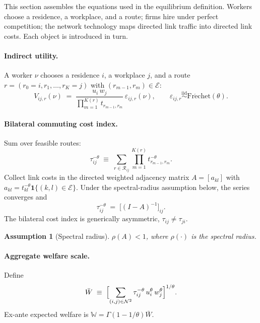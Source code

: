 \documentclass[12pt]{article}
\newtheorem{assumption}{Assumption}
\newcommand{\N}{\mathcal N}
\newcommand{\E}{\mathcal E}
\newcommand{\R}{\mathcal R}
\newcommand{\Wbar}{\bar W}
\newcommand{\tkl}{t_{kl}}
\newcommand{\tijk}{\tau_{ij}}
\begin{document}
This section assembles the equations used in the equilibrium
definition.  Workers choose a residence, a workplace, and a route;
firms hire under perfect competition; the network technology maps
directed link traffic into directed link costs.  Each object is
introduced in turn.

\paragraph{Indirect utility.}
A worker $\nu$ chooses a residence $i$, a workplace $j$, and a route
$r=(r_0=i,r_1,\dots,r_K=j)$ with $(r_{m-1},r_m)\in\E$:
\begin{equation}
  V_{ij,r}(\nu)
  \;=\;
  \frac{u_i\,w_j}{\prod_{m=1}^{K(r)}t_{r_{m-1},r_m}}\,
  \varepsilon_{ij,r}(\nu),
  \qquad
  \varepsilon_{ij,r}\overset{\mathrm{iid}}{\sim}\mathrm{Fr\acute echet}(\theta).
  \label{eq:utility}
\end{equation}

\paragraph{Bilateral commuting cost index.}
Sum over feasible routes:
\begin{equation}
  \tijk^{-\theta}
  \;\equiv\;
  \sum_{r\in\R_{ij}}\prod_{m=1}^{K(r)}t_{r_{m-1},r_m}^{-\theta}.
  \label{eq:tau_def}
\end{equation}
Collect link costs in the directed weighted adjacency matrix
$A=[a_{kl}]$ with $a_{kl}=\tkl^{-\theta}\mathbf 1\{(k,l)\in\E\}$.
Under the spectral-radius assumption below, the series converges and
\begin{equation}
  \tijk^{-\theta}\;=\;\bigl[(I-A)^{-1}\bigr]_{ij}.
  \label{eq:tau_series}
\end{equation}
The bilateral cost index is generically asymmetric,
$\tijk\ne\tau_{ji}$.

\begin{assumption}[Spectral radius]\label{ass:specrad}
$\rho(A)<1$, where $\rho(\cdot)$ is the spectral radius.
\end{assumption}

\paragraph{Aggregate welfare scale.}
Define
\begin{equation}
  \Wbar\;\equiv\;
  \Bigl[\sum_{(i,j)\in\N^2}\tijk^{-\theta}\,u_i^{\theta}\,w_j^{\theta}\Bigr]^{1/\theta}.
  \label{eq:Wbar_def}
\end{equation}
Ex-ante expected welfare is $\mathbb W=\Gamma(1-1/\theta)\Wbar$.
\end{document}
